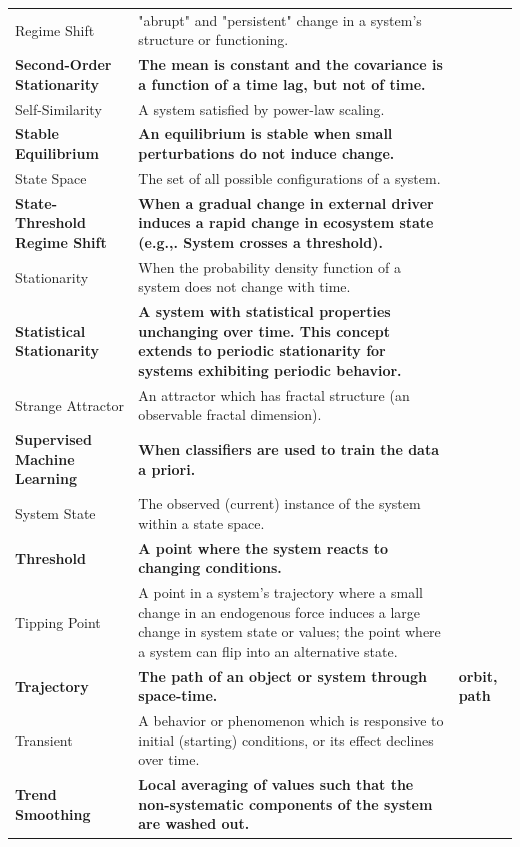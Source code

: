 \documentclass[12pt,twoside,openany]{reedthesis}
\begin{document}
\begin{landscape}
\begin{longtable}{>{\raggedright\arraybackslash}p{12em}>{\raggedright\arraybackslash}p{35em}>{\raggedright\arraybackslash}p{8em}}
Regime Shift & "abrupt" and "persistent" change in a system's structure or functioning. & \\
\textbf{Second-Order Stationarity} & \textbf{The mean is constant and the covariance is a function of a time lag, but not of time.} & \textbf{}\\
Self-Similarity & A system satisfied by  power-law scaling. & \\
\textbf{Stable Equilibrium} & \textbf{An equilibrium is stable when small perturbations do not induce change.} & \textbf{}\\
\addlinespace
State Space & The set of all possible configurations of a system. & \\
\textbf{State-Threshold Regime Shift} & \textbf{When a gradual change in external driver induces a rapid change in ecosystem state (e.g.,. System crosses a threshold).} & \textbf{}\\
Stationarity & When the probability density function of a system does not change with time. & \\
\textbf{Statistical Stationarity} & \textbf{A system with statistical properties unchanging over time. This concept extends to periodic stationarity for systems exhibiting periodic behavior.} & \textbf{}\\
Strange Attractor & An attractor which has fractal structure (an observable fractal dimension). & \\
\addlinespace
\textbf{Supervised Machine Learning} & \textbf{When classifiers are used to train the data a priori.} & \textbf{}\\
System State & The observed (current) instance of the system within a state space. & \\
\textbf{Threshold} & \textbf{A point where the system reacts to changing conditions.} & \textbf{}\\
Tipping Point & A point in a system's trajectory where a small change in an endogenous force induces a large change in system state or values; the point where a system can flip into an alternative state. & \\
\textbf{Trajectory} & \textbf{The path of an object or system through space-time.} & \textbf{orbit, path}\\
\addlinespace
Transient & A behavior or phenomenon which is responsive to initial (starting) conditions, or its effect declines over time. & \\
\textbf{Trend Smoothing} & \textbf{Local averaging of values such that the non-systematic components of the system are washed out.} & \textbf{}\\

\end{longtable}
\end{landscape}
\end{document}
